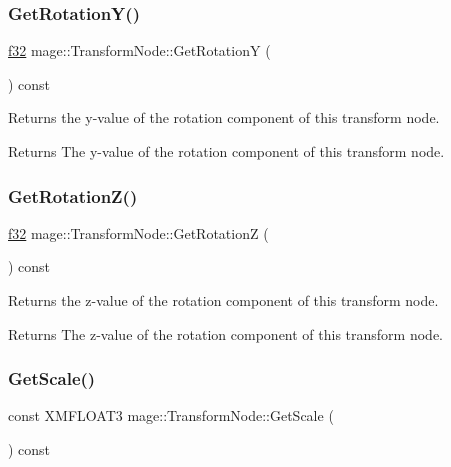 \subsubsection{\texorpdfstring{Get\+Rotation\+Y()}{GetRotationY()}}
{\footnotesize\ttfamily \hyperlink{namespacemage_a6a44ad388483959dc4dff9f2aef91431}{f32} mage\+::\+Transform\+Node\+::\+Get\+RotationY (\begin{DoxyParamCaption}{ }\end{DoxyParamCaption}) const\hspace{0.3cm}{\ttfamily [noexcept]}}

Returns the y-\/value of the rotation component of this transform node.

\begin{DoxyReturn}{Returns}
The y-\/value of the rotation component of this transform node. 
\end{DoxyReturn}
\hypertarget{structmage_1_1_transform_node_a9cbdf5924ac2d100cef5d03e031de3ac}{}\label{structmage_1_1_transform_node_a9cbdf5924ac2d100cef5d03e031de3ac} 
\subsubsection{\texorpdfstring{Get\+Rotation\+Z()}{GetRotationZ()}}
{\footnotesize\ttfamily \hyperlink{namespacemage_a6a44ad388483959dc4dff9f2aef91431}{f32} mage\+::\+Transform\+Node\+::\+Get\+RotationZ (\begin{DoxyParamCaption}{ }\end{DoxyParamCaption}) const\hspace{0.3cm}{\ttfamily [noexcept]}}

Returns the z-\/value of the rotation component of this transform node.

\begin{DoxyReturn}{Returns}
The z-\/value of the rotation component of this transform node. 
\end{DoxyReturn}
\hypertarget{structmage_1_1_transform_node_a23109efb661cb17d3957286952334dc2}{}\label{structmage_1_1_transform_node_a23109efb661cb17d3957286952334dc2} 
\subsubsection{\texorpdfstring{Get\+Scale()}{GetScale()}}
{\footnotesize\ttfamily const X\+M\+F\+L\+O\+A\+T3 mage\+::\+Transform\+Node\+::\+Get\+Scale (\begin{DoxyParamCaption}{ }\end{DoxyParamCaption}) const\hspace{0.3cm}{\ttfamily [noexcept]}}

